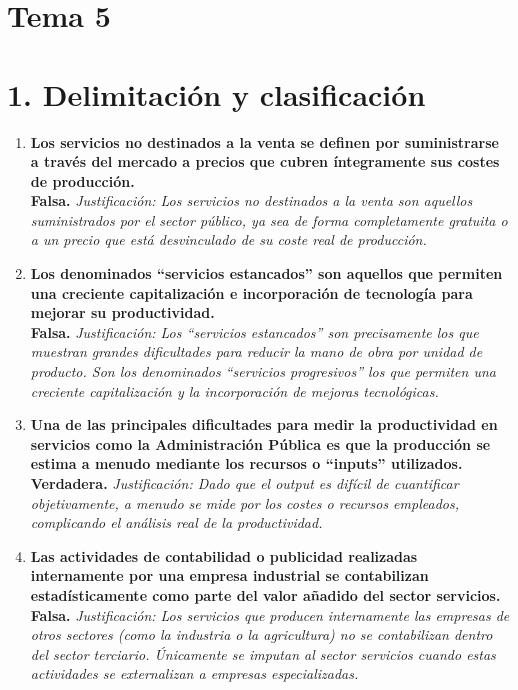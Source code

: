 \section{Tema 5}
\section*{1. Delimitación y clasificación}

\begin{enumerate}[label=\textbf{\arabic*.}]

    \item \textbf{Los servicios no destinados a la venta se definen por suministrarse a través del mercado a precios que cubren íntegramente sus costes de producción.} \\
    \textbf{Falsa.} \textit{Justificación: Los servicios no destinados a la venta son aquellos suministrados por el sector público, ya sea de forma completamente gratuita o a un precio que está desvinculado de su coste real de producción.}

    \item \textbf{Los denominados ``servicios estancados'' son aquellos que permiten una creciente capitalización e incorporación de tecnología para mejorar su productividad.} \\
    \textbf{Falsa.} \textit{Justificación: Los ``servicios estancados'' son precisamente los que muestran grandes dificultades para reducir la mano de obra por unidad de producto. Son los denominados ``servicios progresivos'' los que permiten una creciente capitalización y la incorporación de mejoras tecnológicas.}

    \item \textbf{Una de las principales dificultades para medir la productividad en servicios como la Administración Pública es que la producción se estima a menudo mediante los recursos o ``inputs'' utilizados.} \\
    \textbf{Verdadera.} \textit{Justificación: Dado que el output es difícil de cuantificar objetivamente, a menudo se mide por los costes o recursos empleados, complicando el análisis real de la productividad.}

    \item \textbf{Las actividades de contabilidad o publicidad realizadas internamente por una empresa industrial se contabilizan estadísticamente como parte del valor añadido del sector servicios.} \\
    \textbf{Falsa.} \textit{Justificación: Los servicios que producen internamente las empresas de otros sectores (como la industria o la agricultura) no se contabilizan dentro del sector terciario. Únicamente se imputan al sector servicios cuando estas actividades se externalizan a empresas especializadas.}


\end{enumerate}
